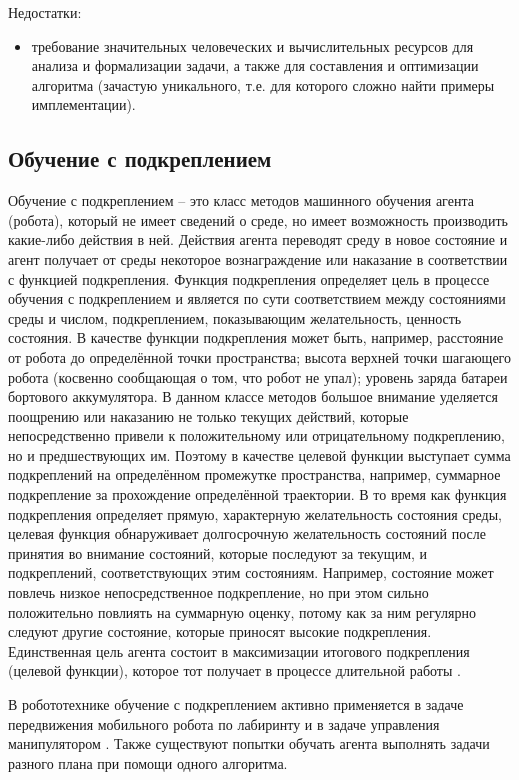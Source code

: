 Недостатки:
\begin{itemize}
	\item требование значительных человеческих и вычислительных ресурсов для анализа и формализации задачи, 
а также для составления и оптимизации алгоритма (зачастую уникального, т.е. для которого сложно найти примеры имплементации).
\end{itemize}


\subsection{Обучение с подкреплением}

Обучение с подкреплением -- это класс методов машинного обучения агента (робота), который не имеет сведений о среде, но имеет возможность производить какие-либо действия в ней. 
Действия агента переводят среду в новое состояние и агент получает от среды некоторое вознаграждение или наказание в соответствии с функцией подкрепления. 
Функция подкрепления определяет цель в процессе обучения с подкреплением и является по сути соответствием между состояниями среды и числом, подкреплением, показывающим желательность, ценность состояния. В качестве функции подкрепления может быть, например, расстояние от робота до определённой точки пространства; высота верхней точки шагающего робота (косвенно сообщающая о том, что робот не упал); уровень заряда батареи бортового аккумулятора.
В данном классе методов большое внимание уделяется поощрению или наказанию не только текущих действий, которые непосредственно привели к положительному или отрицательному подкреплению, но и предшествующих им.
Поэтому в качестве целевой функции выступает сумма подкреплений на определённом промежутке пространства, например, суммарное подкрепление за прохождение определённой траектории.
В то время как функция подкрепления определяет прямую, характерную желательность состояния среды, целевая функция обнаруживает долгосрочную желательность состояний после принятия во внимание состояний, которые последуют за текущим, и подкреплений, соответствующих этим состояниям. 
Например, состояние может повлечь низкое непосредственное подкрепление, но при этом сильно положительно повлиять на суммарную оценку, потому как за ним регулярно следуют другие состояние, которые приносят высокие подкрепления. 
Единственная цель агента состоит в максимизации итогового подкрепления (целевой функции), которое тот получает в процессе длительной работы \cite{reinf_lern}.  

В робототехнике обучение с подкреплением активно применяется в задаче передвижения мобильного робота по лабиринту \cite{reinf_lern1} и в задаче управления манипулятором \cite{reinf_lern2}. 
Также существуют попытки обучать агента выполнять задачи разного плана при помощи одного алгоритма\cite{reinf_lern3}.

